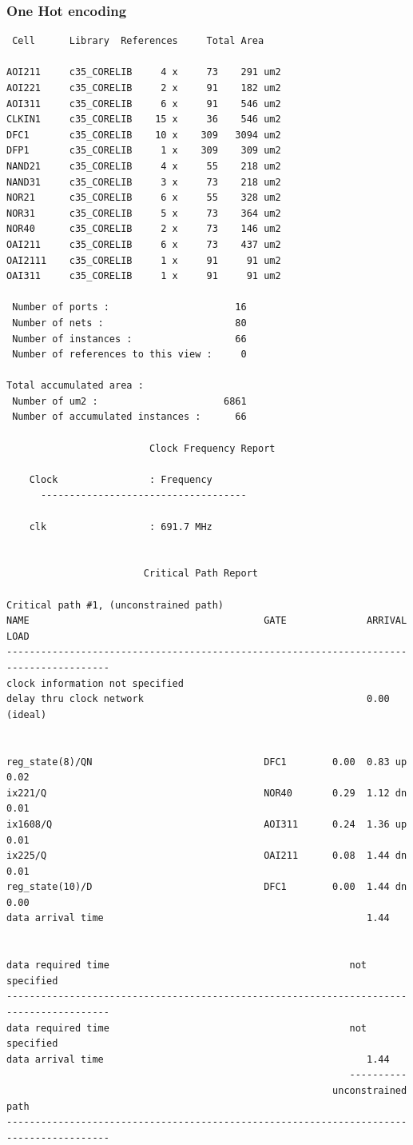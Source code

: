 \documentclass[a4paper,11pt]{article}
\begin{document}
\subsubsection{One Hot encoding}
\begin{verbatim}
 Cell      Library  References     Total Area

AOI211     c35_CORELIB     4 x     73    291 um2
AOI221     c35_CORELIB     2 x     91    182 um2
AOI311     c35_CORELIB     6 x     91    546 um2
CLKIN1     c35_CORELIB    15 x     36    546 um2
DFC1       c35_CORELIB    10 x    309   3094 um2
DFP1       c35_CORELIB     1 x    309    309 um2
NAND21     c35_CORELIB     4 x     55    218 um2
NAND31     c35_CORELIB     3 x     73    218 um2
NOR21      c35_CORELIB     6 x     55    328 um2
NOR31      c35_CORELIB     5 x     73    364 um2
NOR40      c35_CORELIB     2 x     73    146 um2
OAI211     c35_CORELIB     6 x     73    437 um2
OAI2111    c35_CORELIB     1 x     91     91 um2
OAI311     c35_CORELIB     1 x     91     91 um2

 Number of ports :                      16
 Number of nets :                       80
 Number of instances :                  66
 Number of references to this view :     0

Total accumulated area : 
 Number of um2 :                      6861
 Number of accumulated instances :      66
 
                         Clock Frequency Report

	Clock                : Frequency
      ------------------------------------

	clk                  : 691.7 MHz


                        Critical Path Report

Critical path #1, (unconstrained path)
NAME                                         GATE              ARRIVAL              LOAD
----------------------------------------------------------------------------------------
clock information not specified
delay thru clock network                                       0.00 (ideal)


reg_state(8)/QN                              DFC1        0.00  0.83 up             0.02
ix221/Q                                      NOR40       0.29  1.12 dn             0.01
ix1608/Q                                     AOI311      0.24  1.36 up             0.01
ix225/Q                                      OAI211      0.08  1.44 dn             0.01
reg_state(10)/D                              DFC1        0.00  1.44 dn             0.00
data arrival time                                              1.44


data required time                                          not specified
----------------------------------------------------------------------------------------
data required time                                          not specified
data arrival time                                              1.44
                                                            ----------
                                                         unconstrained path
----------------------------------------------------------------------------------------
\end{verbatim}
	
\end{document}
